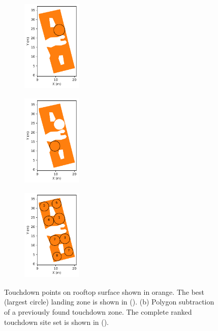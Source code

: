 \begin{figure}[ht]
  \centering
  \begin{subfigure}[b]{0.32\linewidth}
    \centering\includegraphics[width=80pt,height=125pt]{chapter_5_mapping/imgs/74200284_polygonbuffer_lc.pdf}
    \caption{\label{fig:ch5_polylabel_example}}
  \end{subfigure}
  \begin{subfigure}[b]{0.32\linewidth}
    \centering\includegraphics[width=80pt,height=125pt]{chapter_5_mapping/imgs/74200284_polygonbuffer_second_lc.pdf}
    \caption{\label{fig:ch5_polylabel_example_second}}
  \end{subfigure}%
  \begin{subfigure}[b]{0.32\linewidth}
    \centering\includegraphics[width=80pt,height=125pt]{chapter_5_mapping/imgs/74200284_polygonbuffer_all_lc.pdf}
    \caption{\label{fig:ch5_polylabel_example_all}}
  \end{subfigure}%
  \caption[Touchdown point extraction on rooftops]{Touchdown points on rooftop surface shown in orange. The best (largest circle) landing zone is shown in (). (b) Polygon subtraction of a previously found touchdown zone. The complete ranked touchdown site set is shown in ().}
  \label{fig:ch5_touchdown_zones}
\end{figure}

